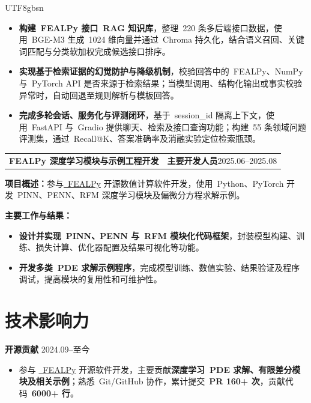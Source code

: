 \documentclass[10.5pt,a4paper]{article}
\makeatletter
\newcommand{\resumeItem}[1]{\item #1}
\newcommand{\projectHeader}[3]{%
  \noindent
  \begin{tabular*}{\textwidth}{@{\extracolsep{\fill}}lr}
    \textbf{#1} &
    \textbf{#2}\hspace{1.5em}#3
  \end{tabular*}

  \vspace{0.15em}
}
\newcommand{\subTitle}[2]{
  \textbf{#1}
  \hfill
  #2
}
\makeatother
\begin{document}
\begin{CJK*}{UTF8}{gbsn}
\begin{itemize}
\resumeItem{\textbf{构建\ FEALPy 接口\ RAG 知识库}，整理\ 220 条多后端接口数据，使用\ BGE-M3 生成\ 1024 维向量并通过\ Chroma 持久化，结合语义召回、关键词匹配与分类软加权完成候选接口排序。}

\resumeItem{\textbf{实现基于检索证据的幻觉防护与降级机制}，校验回答中的\ FEALPy、NumPy 与\ PyTorch API 是否来源于检索结果；当模型调用、结构化输出或事实校验异常时，自动回退至规则解析与模板回答。}

\resumeItem{\textbf{完成多轮会话、服务化与评测闭环}，基于\ session\_id 隔离上下文，使用\ FastAPI 与\ Gradio 提供聊天、检索及接口查询功能；构建\ 55 条领域问题评测集，通过\ Recall@K、答案准确率及消融实验定位检索瓶颈。}

\end{itemize}

\vspace{0.7em}

\projectHeader
{FEALPy 深度学习模块与示例工程开发}
{主要开发人员}
{2025.06--2025.08}

\smallskip

\textbf{项目概述：}{参与\href{https://github.com/chenchunmei-daphne/fealpy}{\ FEALPy} 开源数值计算软件开发，使用\ Python、PyTorch 开发\ PINN、PENN、RFM 深度学习模块及偏微分方程求解示例。}

\par \medskip
\textbf{主要工作与结果：}
\begin{itemize}

\resumeItem{\textbf{设计并实现\ PINN、PENN 与\ RFM 模块化代码框架}，封装模型构建、训练、损失计算、优化器配置及结果可视化等功能。}

\resumeItem{\textbf{开发多类\ PDE 求解示例程序}，完成模型训练、数值实验、结果验证及程序调试，提高模块的复用性和可维护性。}

\end{itemize}

\vspace{0.7em}

\section*{技术影响力}

\subTitle{开源贡献}{2024.09--至今}

\begin{itemize}

\resumeItem{参与
\href{https://github.com/chenchunmei-daphne/fealpy}{\ FEALPy}
开源软件开发，主要贡献\textbf{深度学习\ PDE 求解、有限差分模块及相关示例}；熟悉\ Git/GitHub 协作，累计提交\ \textbf{PR 160+ 次}，贡献代码\ \textbf{6000+ 行}。}


\end{itemize}
\end{CJK*}
\end{document}
